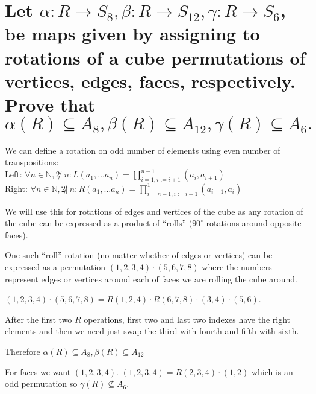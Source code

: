 \documentclass[11pt]{article}
\begin{document}
    \part*{Let $\alpha: R \rightarrow S_8, \beta: R \rightarrow S_{12}, \gamma: R \rightarrow S_6$, be maps given by assigning to
    rotations of a cube permutations of vertices, edges, faces, respectively.
    Prove that $\alpha(R) \subseteq A_8, \beta(R) \subseteq A_{12}, \gamma(R) \subseteq A_6.$}

    We can define a rotation on odd number of elements using even number of transpositions: \\
    Left: $\forall n \in \mathbb{N}, 2 \not| \ n: L(a_1, \dots a_n) = \prod\limits_{i = 1, i := i + 1}^{n - 1} (a_{i}, a_{i + 1})$ \\
    Right: $\forall n \in \mathbb{N}, 2 \not| \ n:R(a_1, \dots a_n) = \prod\limits_{i = n - 1, i := i - 1}^{1} (a_{i + 1}, a_{i})$

    We will use this for rotations of edges and vertices of the cube as any rotation of the cube can be expressed as a product of ``rolls'' ($90^\circ$ rotations around opposite faces).

    One such ``roll'' rotation (no matter whether of edges or vertices) can be expressed as a permutation $(1, 2, 3, 4) \cdot (5, 6, 7, 8)$ where the numbers represent edges or vertices around each of faces we are rolling the cube around.

    $(1, 2, 3, 4) \cdot (5, 6, 7, 8) = R(1, 2, 4) \cdot R(6, 7, 8) \cdot (3, 4) \cdot (5, 6)$.

    After the first two $R$ operations, first two and last two indexes have the right elements and then we need just swap the third with fourth and fifth with sixth.

    Therefore $\alpha(R) \subseteq A_8, \beta(R) \subseteq A_{12}$

    For faces we want $(1, 2, 3, 4)$. $(1, 2, 3, 4) = R(2, 3, 4) \cdot (1, 2)$ which is an odd permutation so $\gamma(R) \not\subseteq A_6$.
\end{document}
